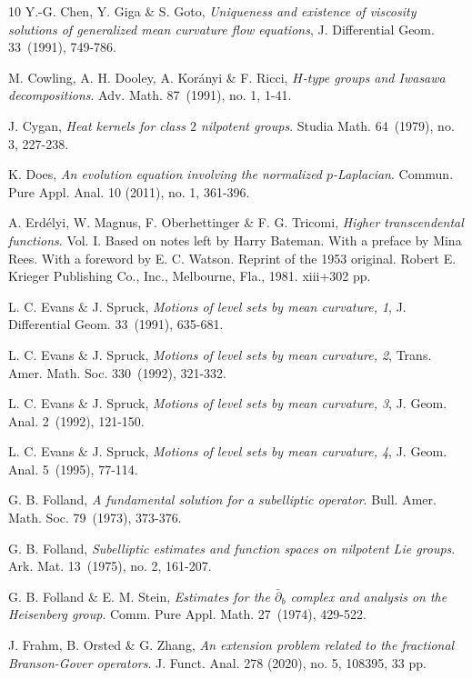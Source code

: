 \documentclass[11pt,a4paper]{amsart}
\newcommand{\p}{\partial}
\numberwithin{equation}{section}
\numberwithin{equation}{section}
\begin{document}
\begin{thebibliography}{10}
Y.-G. Chen, Y. Giga \& S. Goto, \emph{Uniqueness and existence  of viscosity solutions  of generalized  mean curvature  flow equations}, J. Differential Geom. 33~(1991), 749-786.




M. Cowling, A. H. Dooley, A. Kor\'anyi \& F. Ricci, \emph{$H$-type groups and Iwasawa decompositions}. Adv. Math. 87~(1991), no. 1, 1-41.


J. Cygan, \emph{Heat kernels for class $2$ nilpotent groups}. Studia Math. 64~(1979), no. 3, 227-238.






K. Does, \emph{An evolution equation involving the normalized  $p$-Laplacian}.
Commun. Pure Appl. Anal. 10 (2011), no. 1, 361-396.

A. Erd\'elyi, W. Magnus, F. Oberhettinger \& F. G. Tricomi, \emph{Higher transcendental functions}. Vol. I. Based on notes left by Harry Bateman. With a preface by Mina Rees. With a foreword by E. C. Watson. Reprint of the 1953 original. Robert E. Krieger Publishing Co., Inc., Melbourne, Fla., 1981. xiii+302 pp. 

L. C. Evans \& J. Spruck, \emph{Motions of  level sets  by mean  curvature, 1}, J. Differential Geom. 33~(1991), 635-681.

L. C. Evans \& J. Spruck, \emph{Motions of  level sets  by mean  curvature,  2}, Trans. Amer. Math. Soc. 330~(1992), 321-332.

L. C. Evans \& J. Spruck, \emph{Motions of  level sets  by mean  curvature, 3},  J. Geom. Anal. 2~(1992), 121-150.


L. C. Evans \& J. Spruck, \emph{Motions of  level sets  by mean  curvature, 4},  J. Geom. Anal. 5~(1995), 77-114.



G. B. Folland, \emph{A fundamental solution for a subelliptic operator}. Bull. Amer. Math. Soc. 79~(1973), 373-376.

G. B. Folland, \emph{Subelliptic estimates and function spaces on nilpotent Lie groups}. Ark. Mat. 13~(1975), no. 2, 161-207. 


G. B. Folland \& E. M. Stein, \emph{Estimates for the $\bar \p_b$ complex and analysis on the Heisenberg group}. Comm. Pure Appl. Math. 27~(1974), 429-522. 

J. Frahm, B. Orsted \& G. Zhang, \emph{
An extension problem related to the fractional Branson-Gover operators}.
J. Funct. Anal. 278 (2020), no. 5, 108395, 33 pp.


\end{thebibliography}
\end{document}
